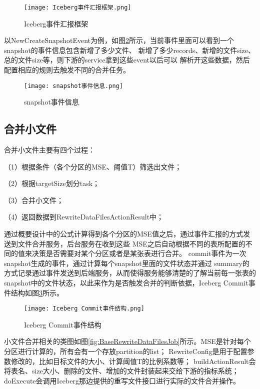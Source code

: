 \begin{figure}[H]
  \centering
  \texttt{[image: Iceberg事件汇报框架.png]}
  \caption{Iceberg事件汇报框架}
  \label{fig:Iceberg事件汇报框架}
\end{figure}

以NewCreateSnapshotEvent为例，如图\ref{fig:snapshot事件信息}所示，当前事件里面可以看到一个snapshot的事件信息包含新增了多少文件、
新增了多少records、新增的文件size、总的文件size等，则下游的service拿到这些event以后可以
解析开这些数据，然后配置相应的规则去触发不同的合并任务。

\begin{figure}[H]
  \centering
  \texttt{[image: snapshot事件信息.png]}
  \caption{snapshot事件信息}
  \label{fig:snapshot事件信息}
\end{figure}

\subsection{合并小文件}

合并⼩⽂件主要有四个过程：

（1）根据条件（各个分区的MSE、阈值T）筛选出⽂件；

（2）根据targetSize划分task；

（3）合并⼩⽂件；

（4）返回数据到RewriteDataFilesActionResult中；

通过概要设计中的公式计算得到各个分区的MSE值之后，通过事件汇报的方式发送到文件合并服务，后台服务在收到这些
MSE之后自动根据不同的表所配置的不同的值来决策是否需要对某个分区或者是某张表进行合并。
commit事件为一次snapshot生成的事件，通过计算每个snapshot里面的文件状态并通过
summary的方式记录通过事件发送到后端服务，从而使得服务能够清楚的了解当前每一张表的
snapshot中的文件状态，以此来作为是否触发合并的判断依据，Iceberg Commit事件结构如图\ref{fig:Commit事件结构}所示。

\begin{figure}[H]
  \centering
  \texttt{[image: Iceberg Commit事件结构.png]}
  \caption{Iceberg Commit事件结构}
  \label{fig:Commit事件结构}
\end{figure}

小文件合并相关的类图如图\ref{fig:BaseRewriteDataFilesJob}所示。MSE是针对每个分区进行计算的，所有会有一个存放partition的list；
RewriteConfig是用于配置参数修改的，比如目标文件的大小、计算阈值T的比例系数等；
buildActionResult会将表名、size大小、删除的文件、增加的文件封装起来交给下游的指标系统；
doExecute会调用Iceberg那边提供的重写文件接口进行实际的文件合并操作。


